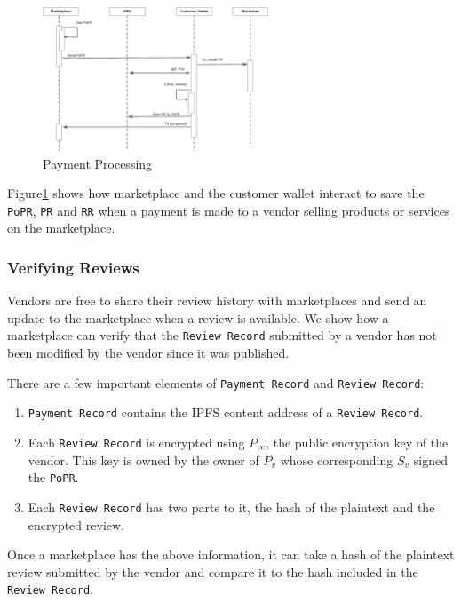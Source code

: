 \documentclass[a4paper]{article}
\begin{document}
\begin{figure}
\centering
\includegraphics[width=0.6\textwidth]{../payment-processing.eps}
\caption{\label{fig:payment-processing}{Payment Processing}}
\end{figure}

Figure\ref{fig:payment-processing} shows how marketplace and the
customer wallet interact to save the \texttt{PoPR}, \texttt{PR} and
\texttt{RR} when a payment is made to a vendor selling products or
services on the marketplace.


\subsubsection{Verifying Reviews}

Vendors are free to share their review history with marketplaces and
send an update to the marketplace when a review is available. We show
how a marketplace can verify that the \texttt{Review Record} submitted
by a vendor has not been modified by the vendor since it was
published.

There are a few important elements of \texttt{Payment Record} and
\texttt{Review Record}:

\begin{enumerate}
\item \texttt{Payment Record} contains the IPFS content address of a
  \texttt{Review Record}.
  
\item Each \texttt{Review Record} is encrypted using $P_{ve}$, the
  public encryption key of the vendor. This key is owned by the owner
  of $P_v$ whose corresponding $S_v$ signed the \texttt{PoPR}.

\item Each \texttt{Review Record} has two parts to it, the hash of the
  plaintext and the encrypted review.
\end{enumerate}

Once a marketplace has the above information, it can take a hash of
the plaintext review submitted by the vendor and compare it to the
hash included in the \texttt{Review Record}.
\end{document}
